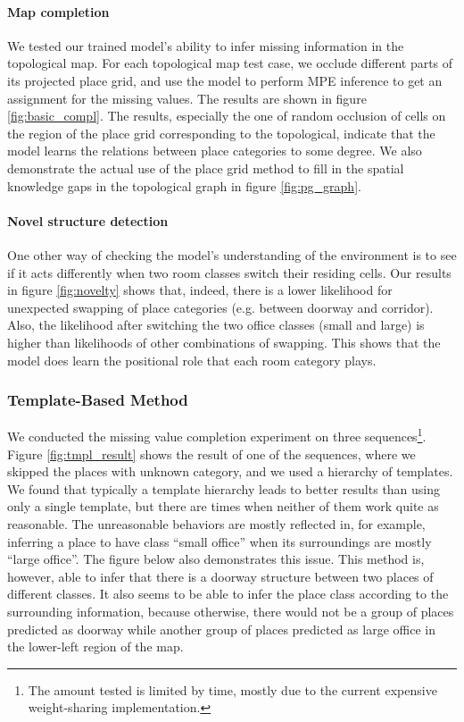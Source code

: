\documentclass[10pt, titlepage]{article}
\theoremstyle{definition}
\begin{document}
\paragraph{Map completion} We tested our trained model's ability to infer missing information in the topological map. For each topological map test case, we occlude different parts of its projected place grid, and use the model to perform MPE inference to get an assignment for the missing values. The results are shown in figure \ref{fig:basic_compl}. The results, especially the one of random occlusion of cells on the region of the place grid corresponding to the topological, indicate that the model learns the relations between place categories to some degree. We also demonstrate the actual use of the place grid method to fill in the spatial knowledge gaps in the topological graph in figure \ref{fig:pg_graph}.

\paragraph{Novel structure detection} One other way of checking the model's understanding of the environment is to see if it acts differently when two room classes switch their residing cells. Our results in figure \ref{fig:novelty} shows that, indeed, there is a lower likelihood for unexpected swapping of place categories (e.g. between doorway and corridor). Also, the likelihood after switching the two office classes (small and large) is higher than likelihoods of other combinations of swapping. This shows that the model does learn the positional role that each room category plays.

\subsubsection{Template-Based Method}

We conducted the missing value completion experiment on three sequences\footnote{The amount tested is limited by time, mostly due to the current expensive weight-sharing implementation.}. Figure \ref{fig:tmpl_result} shows the result of one of the sequences, where we skipped the places with unknown category, and we used a hierarchy of templates. We found that typically a template hierarchy leads to better results than using only a single template, but there are times when neither of them work quite as reasonable. The unreasonable behaviors are mostly reflected in, for example, inferring a place to have class ``small office'' when its surroundings are mostly ``large office''. The figure below also demonstrates this issue. This method is, however, able to infer that there is a doorway structure between two places of different classes. It also seems to be able to infer the place class according to the surrounding information, because otherwise, there would not be a group of places predicted as doorway while another group of places predicted as large office in the lower-left region of the map.
\end{document}
